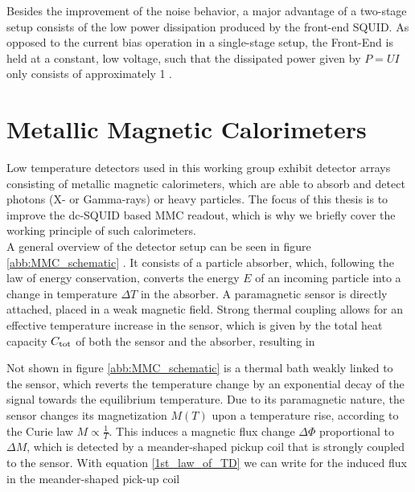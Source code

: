 Besides the improvement of the noise behavior, a major advantage of a two-stage setup consists of the low power dissipation produced by the front-end SQUID. As opposed to the current bias operation in a single-stage setup, the Front-End is held at a constant, low voltage, such that the dissipated power given by $P=UI$ only consists of approximately \qty{1}{\nW} \cite{Drung2007}. 





\section{Metallic Magnetic Calorimeters} \label{sec_MMC}

Low temperature detectors used in this working group exhibit detector arrays consisting of metallic magnetic calorimeters, which are able to absorb and detect photons (X- or Gamma-rays) or heavy particles. The focus of this thesis is to improve the dc-SQUID based MMC readout, which is why we briefly cover the working principle of such calorimeters. \\ 
A general overview of the detector setup can be seen in figure \ref{abb:MMC_schematic} \cite{Fleischmann2005}. It consists of a particle absorber, which, following the law of energy conservation, converts the energy $E$ of an incoming particle into a change in temperature $\Delta T$ in the absorber. A paramagnetic sensor is directly attached, placed in a weak magnetic field. Strong thermal coupling allows for an effective temperature increase in the sensor, which is given by the total heat capacity $C_{\rm tot}$ of both the sensor and the absorber, resulting in 


Not shown in figure \ref{abb:MMC_schematic} is a thermal bath weakly linked to the sensor, which reverts the temperature change by an exponential decay of the signal towards the equilibrium temperature. Due to its paramagnetic nature, the sensor changes its magnetization $M(T)$ upon a temperature rise, according to the Curie law $M\propto \frac{1}{T}$. This induces a magnetic flux change $\Delta\Phi$ proportional to $\Delta M$, which is detected by a meander-shaped pickup coil that is strongly coupled to the sensor. With equation \ref{1st_law_of_TD} we can write for the induced flux in the meander-shaped pick-up coil  

